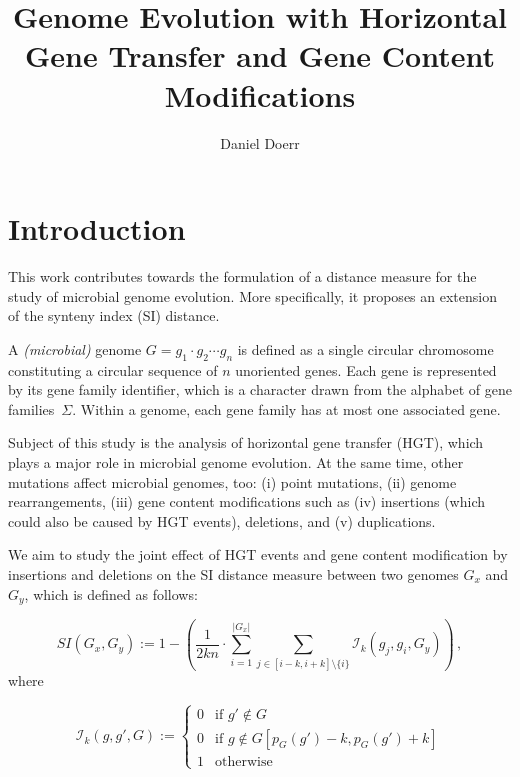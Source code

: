 \documentclass[9pt,english,utf8]{article}
\title{Genome Evolution with Horizontal Gene Transfer and Gene Content
Modifications}
\author{Daniel Doerr}
\begin{document}
\maketitle
\section{Introduction}


%

This work contributes towards the formulation of a distance measure for the
study of microbial genome evolution. More specifically, it proposes an extension
of the synteny index (SI) distance. 

A \emph{(microbial)} genome $G = g_1\cdot g_2 \cdots g_n$ is defined as a single
circular chromosome constituting a circular sequence of $n$ unoriented genes.
Each gene is represented by its gene family identifier, which is a character
drawn from the alphabet of gene families~$\Sigma$. Within a genome, each gene
family has at most one associated gene.

Subject of this study is the analysis of horizontal gene transfer (HGT), which
plays a major role in microbial genome evolution. At the same time, other
mutations affect microbial genomes, too: (i) point mutations, (ii) genome
rearrangements, (iii) gene content modifications such as (iv) insertions (which
could also be caused by HGT events), deletions, and (v) duplications. 

We aim to study the joint effect of HGT events and gene content modification by
insertions and deletions on the SI distance measure between two genomes $G_x$
and $G_y$, which is defined as follows:

\begin{equation}
    SI(G_x, G_y) := 1 - \left(\frac{1}{2kn} \cdot\sum_{i=1}^{|G_x|} \sum_{j \in
    [i-k, i+k]\setminus \{i\}} \mathcal I_{k}(g_j, g_i, G_y)\right)\,,
\end{equation}
\noindent where

\[\mathcal I_{k}(g, g', G):= \begin{cases} 0 & \textrm{if } g' \not\in G\\
    0 & \textrm{if } g \not\in G[p_G(g')-k,p_G(g')+k] \\
    1 & \textrm{otherwise} \end{cases}
\]
\end{document}

